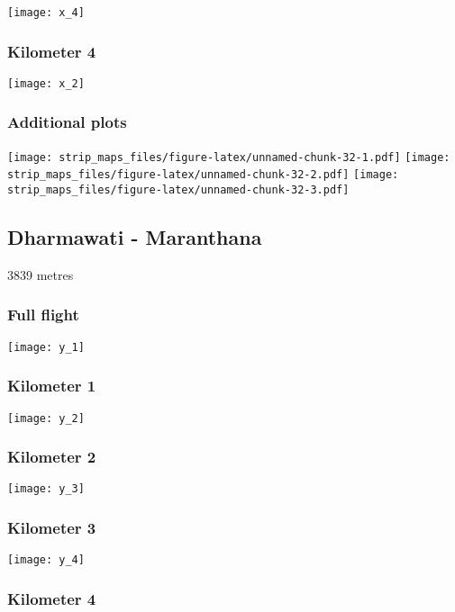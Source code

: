 \documentclass[]{article}
\begin{document}
\texttt{[image: x\_4]}

\subsubsection{Kilometer 4}\label{kilometer-4-22}

\texttt{[image: x\_2]}

\subsubsection{Additional plots}\label{additional-plots-23}

\texttt{[image: strip\_maps\_files/figure-latex/unnamed-chunk-32-1.pdf]}
\texttt{[image: strip\_maps\_files/figure-latex/unnamed-chunk-32-2.pdf]}
\texttt{[image: strip\_maps\_files/figure-latex/unnamed-chunk-32-3.pdf]}

\newpage

\subsection{Dharmawati - Maranthana}\label{dharmawati---maranthana}

3839 metres

\subsubsection{Full flight}\label{full-flight-24}

\texttt{[image: y\_1]}

\subsubsection{Kilometer 1}\label{kilometer-1-24}

\texttt{[image: y\_2]}

\subsubsection{Kilometer 2}\label{kilometer-2-24}

\texttt{[image: y\_3]}

\subsubsection{Kilometer 3}\label{kilometer-3-24}

\texttt{[image: y\_4]}

\subsubsection{Kilometer 4}\label{kilometer-4-23}
\end{document}
